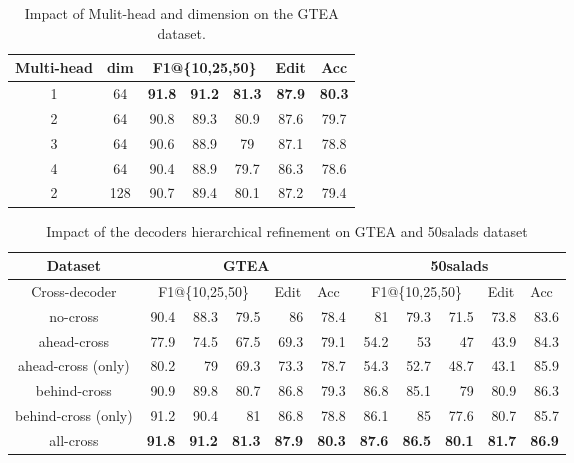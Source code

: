 \documentclass[runningheads]{llncs}
\begin{document}
\begin{table}[ht]
	\centering
	\caption{Impact of Mulit-head and dimension on the GTEA dataset.}
\begin{tabular}{ccccccc}
			\toprule
			Multi-head & dim   & \multicolumn{3}{c}{F1@\{10,25,50\}} & Edit  & Acc \\
			\midrule
			1     & 64    & \textbf{91.8} & \textbf{91.2} & \textbf{81.3} & \textbf{87.9} & \textbf{80.3} \\
			2     & 64    & 90.8  & 89.3  & 80.9  & 87.6  & 79.7 \\
			3     & 64    & 90.6  & 88.9  & 79    & 87.1  & 78.8 \\
			4     & 64    & 90.4  & 88.9  & 79.7  & 86.3  & 78.6 \\
			2     & 128   & 90.7  & 89.4  & 80.1  & 87.2  & 79.4 \\
			\bottomrule
	\end{tabular}\label{tab1}\end{table}\begin{table*}[htbp]
	\centering
	\caption{Impact of the decoders hierarchical refinement on GTEA and 50salads dataset}
\begin{tabular}{crrrrrrrrrr}
		\toprule
		Dataset & \multicolumn{5}{c}{GTEA}              & \multicolumn{5}{c}{50salads} \\
		\midrule
		Cross-decoder & \multicolumn{3}{c}{F1@\{10,25,50\}} & \multicolumn{1}{l}{Edit} & \multicolumn{1}{l}{Acc} & \multicolumn{3}{c}{F1@\{10,25,50\}} & \multicolumn{1}{l}{Edit} & \multicolumn{1}{l}{Acc} \\
		\midrule
		
		no-cross & 90.4  &  88.3 &  79.5  & 86  &  78.4  & 81  & 79.3    & 71.5  & 73.8  & 83.6 \\				
		ahead-cross  & 77.9 & 74.5  & 67.5 & 69.3  & 79.1    & 54.2  & 53  & 47  & 43.9 & 84.3 \\
		ahead-cross (only) &80.2	&79	&69.3&	73.3&	78.7&	54.3&	52.7&	48.7&	43.1&	85.9  \\
		behind-cross & 90.9  & 89.8  & 80.7  & 86.8  & 79.3  & 86.8    & 85.1  & 79  & 80.9  & 86.3 \\	
		behind-cross (only) & 91.2&	90.4&	81&	86.8&	78.8&	86.1&	85&	77.6&	80.7&	85.7\\
		all-cross  & \textbf{91.8}  & \textbf{91.2} & \textbf{81.3}  & \textbf{87.9} & \textbf{80.3}  & \textbf{87.6} & \textbf{86.5} & \textbf{80.1} & \textbf{81.7} & \textbf{86.9} \\
		\bottomrule
	\end{tabular}\label{tab7}\end{table*}
\end{document}
